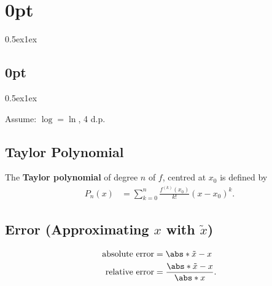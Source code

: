 \documentclass{article}
\begin{document}
\titlespacing*\section{0pt}{0.5ex}{1ex}
\titlespacing*\subsection{0pt}{0.5ex}{1ex}
%
\setlength\abovecaptionskip{8pt}
\setlength\belowcaptionskip{-15pt}
\setlength\textfloatsep{0pt}
%
\setlength\abovedisplayskip{1pt}
\setlength\belowdisplayskip{1pt}

\begin{multicols}{3}
    Assume: \(\log=\ln\), 4 d.p.
    \subsection{Taylor Polynomial}
    The \textbf{Taylor polynomial} of degree \(n\) of \(f\), centred at \(x_0\) is defined by
    \begin{align*}
        P_n\left( x \right) & = \sum_{k = 0}^n \frac{f^{\left( k \right)}\left( x_0 \right)}{k!} \left( x - x_0 \right)^k.
    \end{align*}
    \subsection{Error (Approximating \texorpdfstring{\(x\)}{x} with \texorpdfstring{\(\tilde{x}\)}{tilde-x})}
    \begin{align*}
        \text{absolute error} & = \abs*{\tilde{x}-x}                   \\
        \text{relative error} & = \frac{\abs*{\tilde{x}-x}}{\abs*{x}}.
    \end{align*}

\end{multicols}
\end{document}
